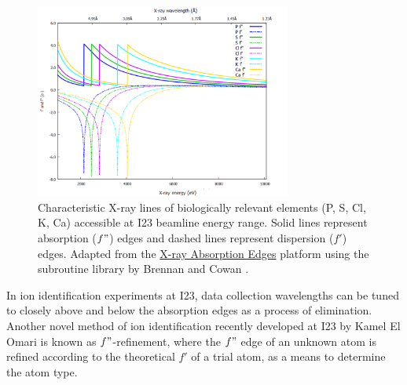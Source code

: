 \begin{figure}[h]
    \centering
    \includegraphics[width = 0.75\textwidth]{images/absorption lines high quality cropped.png}
    \caption{Characteristic X-ray lines of biologically relevant elements (P, S, Cl, K, Ca) accessible at I23 beamline energy range. Solid lines represent absorption ($f"$) edges and dashed lines represent dispersion ($f'$) edges. Adapted from the \href{http://skuld.bmsc.washington.edu/scatter/AS_periodic.html}{X-ray Absorption Edges} platform using the subroutine library by Brennan and Cowan \cite{Brennan1992}.}%
    \label{Anomaluos scattering edges}
\end{figure}

In ion identification experiments at I23, data collection wavelengths can be tuned to closely above and below the absorption edges as a process of elimination. %
Another novel method of ion identification recently developed at I23 by Kamel El Omari is known as $f"$-refinement, where the $f"$ edge of an unknown atom is refined according to the theoretical $f'$ of a trial atom, as a means to determine the atom type. %

